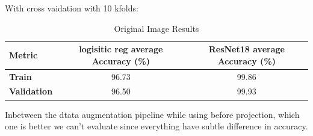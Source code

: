 With cross vaidation with 10 kfolds:             
\begin{table}[H]
    \centering
    \caption{Performance metrics for different augmentation strategies before and after the projection head.}
    \label{tab:augmentation_metric}
\end{table}
\begin{table}[H]
    \centering
    \caption{Original Image Results}
    \label{tab:original_image_results}
    \begin{tabular}{lcc}
    \toprule
    \textbf{Metric}         & \textbf{ logisitic reg average Accuracy (\%)} & \textbf{ResNet18 average Accuracy (\%)} \\ \midrule
    \textbf{Train}          & 96.73                                                     & 99.86                                             \\ 
    \textbf{Validation}     & 96.50                                                     & 99.93                                              \\ 
    \bottomrule
    \end{tabular}
\end{table}


Inbetween the dtata augmentation pipeline while using  before projection, which one is better we can't evaluate since everything have subtle difference in accuracy.



